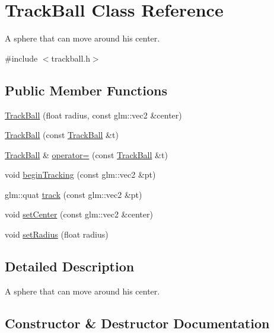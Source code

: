 \hypertarget{class_track_ball}{}\section{Track\+Ball Class Reference}
\label{class_track_ball}


A sphere that can move around his center.  




{\ttfamily \#include $<$trackball.\+h$>$}

\subsection*{Public Member Functions}
\begin{DoxyCompactItemize}
\item 
\mbox{\hyperlink{class_track_ball_a9e524069acc51788c7712765521bc3ce}{Track\+Ball}} (float radius, const glm\+::vec2 \&center)
\item 
\mbox{\hyperlink{class_track_ball_ae391da576b739343d488dbe80302cc0c}{Track\+Ball}} (const \mbox{\hyperlink{class_track_ball}{Track\+Ball}} \&t)
\item 
\mbox{\hyperlink{class_track_ball}{Track\+Ball}} \& \mbox{\hyperlink{class_track_ball_a8a34d15e31c43046f5e12e596ff91b63}{operator=}} (const \mbox{\hyperlink{class_track_ball}{Track\+Ball}} \&t)
\item 
void \mbox{\hyperlink{class_track_ball_a98dca62dce061a1f880278e55bbc1afb}{begin\+Tracking}} (const glm\+::vec2 \&pt)
\item 
glm\+::quat \mbox{\hyperlink{class_track_ball_aa562dadd39fcb9b859026ba14a5ea75f}{track}} (const glm\+::vec2 \&pt)
\item 
void \mbox{\hyperlink{class_track_ball_adf981d2f821a0ba5399289291d0dc646}{set\+Center}} (const glm\+::vec2 \&center)
\item 
void \mbox{\hyperlink{class_track_ball_ab4d35e045512cb2d6d1081f171fbf7d4}{set\+Radius}} (float radius)
\end{DoxyCompactItemize}


\subsection{Detailed Description}
A sphere that can move around his center. 

\subsection{Constructor \& Destructor Documentation}
\mbox{\label{class_track_ball_a9e524069acc51788c7712765521bc3ce}} 
